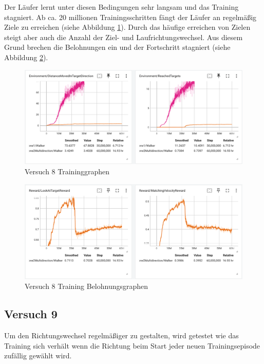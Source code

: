 Der Läufer lernt unter diesen Bedingungen sehr langsam und das Training stagniert. Ab ca. 20 millionen Trainingsschritten fängt der Läufer an regelmäßig Ziele zu erreichen (siehe Abbildung \ref{fig:versuch8_training}). Durch das häufige erreichen von Zielen steigt aber auch die Anzahl der Ziel- und Laufrichtungswechsel. Aus diesem Grund brechen die Belohnungen ein und der Fortschritt stagniert (siehe Abbildung \ref{fig:versuch8_training_belohnung}).

\begin{figure}[H]
  \centering  
  \includegraphics[scale=0.5]{img/versuch8_training.png}
  \caption{Versuch 8 Traininggraphen}
  \label{fig:versuch8_training}
\end{figure}

\begin{figure}[H]
  \centering  
  \includegraphics[scale=0.5]{img/versuch8_training_belohnung.png}
  \caption{Versuch 8 Training Belohnungsgraphen}
  \label{fig:versuch8_training_belohnung}
\end{figure}

\subsection{Versuch 9}
Um den Richtungswechsel regelmäßiger zu gestalten, wird getestet wie das Training sich verhält wenn die Richtung beim Start jeder neuen Trainingsepisode zufällig gewählt wird.

